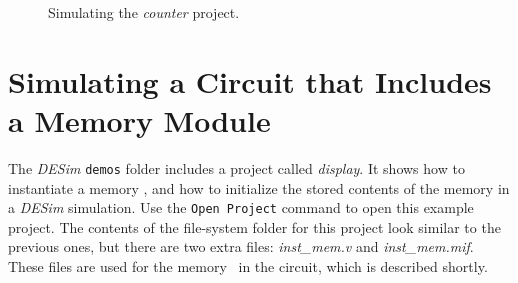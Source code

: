 {\begin{figure}[h]
	\begin{center}
        \setlength{\fboxsep}{0pt}
	\end{center}
          \caption{Simulating the {\it counter} project.}
	\label{fig:sim2}
\end{figure}

\section{Simulating a Circuit that Includes a Memory Module}

The {\it DESim} \texttt{demos} folder includes a project called {\it display}. It shows how 
to instantiate a memory \hdlModuleName, and how to initialize the stored contents of 
the memory in a {\it DESim} simulation.  Use the \texttt{Open Project} command to open this
example project. The contents of the file-system folder for this project look similar to the 
previous ones, but there are two extra files: {\it inst\_mem.v} and {\it inst\_mem.mif}. These 
files are used for the memory \hdlModuleName~in the circuit, which is described shortly.

}
